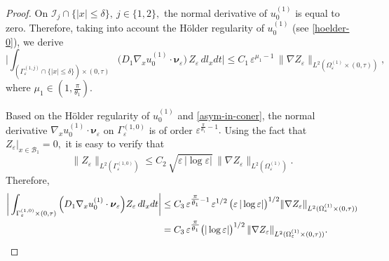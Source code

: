 \documentclass[reqno]{amsart}            %
\numberwithin{equation}{section}
\begin{document}
\begin{proof}
		
		On $\mathcal{I}_j \cap \{|x| \le \delta\}, \ j\in \{1,2\},$ the normal derivative of $u_0^{(1)}$ is equal to zero.  
		Therefore, taking into account the Hölder regularity of $u_0^{(1)}$ (see \eqref{hoelder-0}), we derive
		\begin{equation}\label{th-2}
			\bigg|\int_{(\Gamma_\varepsilon^{(1,j)} \cap \{|x| \le \delta\})\times(0,\tau)}\big(D_1\nabla_x u_0^{(1)}\cdot\boldsymbol{\nu}_\varepsilon \big)\,  Z_\varepsilon \, dl_xdt\bigg| \le C_1 \, \varepsilon^{\mu_1 -1}\, \|\nabla Z_\varepsilon\|_{L^2(\Omega_\varepsilon^{(1)}\times(0,\tau))}, 
		\end{equation}
		where $\mu_1 \in (1, \tfrac{\pi}{\theta_1}).$ 
		
		Based on the Hölder regularity of $u_0^{(1)}$ and \eqref{asym-in-coner},  
		the normal derivative $
		\nabla_x u_0^{(1)}\cdot\boldsymbol{\nu}_\varepsilon  
		$ on $\Gamma_\varepsilon^{(1,0)}$ is of order $\varepsilon^{\tfrac{\pi}{\theta_1} -1}.$
		Using the fact that $Z_\varepsilon|_{x\in \mathcal{B}_1} = 0,$ it is easy to verify that 
		\begin{equation}\label{trace-ineq}
			\|Z_\varepsilon\|_{L^2(\Gamma_\varepsilon^{(1,0)})} \le C_2 \, \sqrt{\varepsilon \, |\log\varepsilon|} \, 
			\|\nabla Z_\varepsilon\|_{L^2(\Omega_\varepsilon^{(1)})}.
		\end{equation}
		Therefore,  
		\begin{align}\label{th-3}
			\bigg|\int_{\Gamma_\varepsilon^{(1,0)} \times(0,\tau)}\Big(D_1\nabla_x u_0^{(1)}\cdot\boldsymbol{\nu}_\varepsilon \Big) Z_\varepsilon \, dl_xdt\bigg| &\le C_3 \, \varepsilon^{\tfrac{\pi}{\theta_1} -1} \, \varepsilon^{1/2} \, \big(\varepsilon \, |\log\varepsilon|\big)^{1/2}  \|\nabla Z_\varepsilon\|_{L^2(\Omega_\varepsilon^{(1)}\times(0,\tau))} \notag
			\\
			& = C_3 \, \varepsilon^{\tfrac{\pi}{\theta_1}} \big(|\log\varepsilon|\big)^{1/2} \, \|\nabla Z_\varepsilon\|_{L^2(\Omega_\varepsilon^{(1)}\times(0,\tau))}. 
		\end{align}
		

\end{proof}
\end{document}
